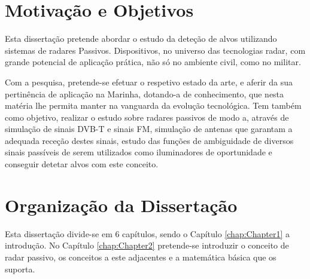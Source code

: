 \section{Motivação e Objetivos}
Esta dissertação pretende abordar o estudo da deteção de alvos utilizando sistemas de radares Passivos. Dispositivos, no universo das tecnologias radar, com grande potencial de aplicação prática, não só no ambiente civil, como no militar.\par
Com a pesquisa, pretende-se efetuar o respetivo estado da arte, e aferir da sua pertinência de aplicação na Marinha, dotando-a de conhecimento, que nesta matéria lhe permita manter na vanguarda da evolução tecnológica. Tem também como objetivo, realizar o estudo sobre radares passivos de modo a, através de simulação de sinais \gls{DVB-T} e sinais \gls{FM}, simulação de antenas que garantam a adequada receção destes sinais, estudo das funções de ambiguidade de diversos sinais passíveis de serem utilizados como iluminadores de oportunidade e conseguir detetar alvos com este conceito. 

\section{Organização da Dissertação}
Esta dissertação divide-se em 6 capítulos, sendo o Capítulo \ref{chap:Chapter1} a introdução. No Capítulo \ref{chap:Chapter2} pretende-se introduzir o conceito de radar passivo, os conceitos a este adjacentes e a matemática básica que os suporta.